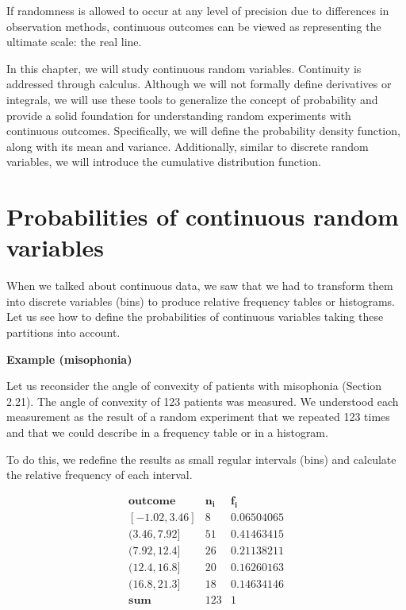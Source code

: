 \documentclass[
]{book}
\begin{document}
If randomness is allowed to occur at any level of precision due to differences in observation methods, continuous outcomes can be viewed as representing the ultimate scale: the real line.

In this chapter, we will study continuous random variables. Continuity is addressed through calculus. Although we will not formally define derivatives or integrals, we will use these tools to generalize the concept of probability and provide a solid foundation for understanding random experiments with continuous outcomes. Specifically, we will define the probability density function, along with its mean and variance. Additionally, similar to discrete random variables, we will introduce the cumulative distribution function.

\hypertarget{probabilities-of-continuous-random-variables}{%
\section{Probabilities of continuous random variables}\label{probabilities-of-continuous-random-variables}}

When we talked about continuous data, we saw that we had to transform them into discrete variables (bins) to produce relative frequency tables or histograms. Let us see how to define the probabilities of continuous variables taking these partitions into account.

\textbf{Example (misophonia)}

Let us reconsider the angle of convexity of patients with misophonia (Section 2.21). The angle of convexity of 123 patients was measured. We understood each measurement as the result of a random experiment that we repeated 123 times and that we could describe in a frequency table or in a histogram.

To do this, we redefine the results as small regular intervals (bins) and calculate the relative frequency of each interval.

\[
\begin{array}{ccc}
\mathbf{outcome} & \mathbf{n_i} & \mathbf{f_i} \\
\mathrm{[-1.02,3.46]}   &  8  & 0.06504065 \\
\mathrm{(3.46,7.92]}    & 51  & 0.41463415 \\
\mathrm{(7.92,12.4]}    & 26  & 0.21138211 \\
\mathrm{(12.4,16.8]}    & 20  & 0.16260163 \\
\mathrm{(16.8,21.3]}    & 18  & 0.14634146 \\ \hline
\mathbf{sum}   & 123 & 1
\end{array}
\]
\end{document}
